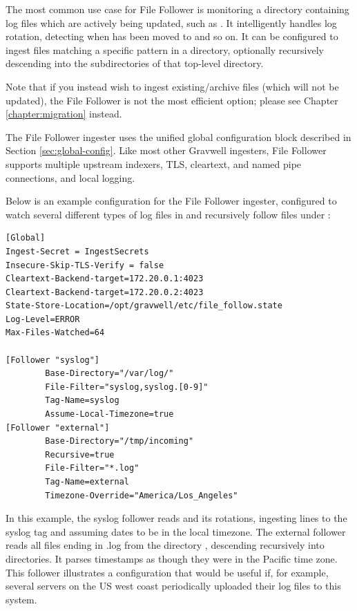 The most common use case for File Follower is monitoring a directory
containing log files which are actively being updated, such
as . It intelligently handles log rotation, detecting when
 has been moved to  and so on. It can be configured to
ingest files matching a specific pattern in a directory, optionally
recursively descending into the subdirectories of that top-level
directory.

Note that if you instead wish to ingest existing/archive files (which will not be updated), the File Follower is not the most efficient option; please see Chapter \ref{chapter:migration} instead.

The File Follower ingester uses the unified global configuration block
described in Section \ref{sec:global-config}. Like most other Gravwell ingesters,
File Follower supports multiple upstream indexers, TLS, cleartext, and
named pipe connections, and local logging.

Below is an example configuration for the File Follower ingester,
configured to watch several different types of log files in
 and recursively follow files under :

\begin{Verbatim}[breaklines=true]
[Global]
Ingest-Secret = IngestSecrets
Insecure-Skip-TLS-Verify = false
Cleartext-Backend-target=172.20.0.1:4023
Cleartext-Backend-target=172.20.0.2:4023
State-Store-Location=/opt/gravwell/etc/file_follow.state
Log-Level=ERROR
Max-Files-Watched=64

[Follower "syslog"]
        Base-Directory="/var/log/"
        File-Filter="syslog,syslog.[0-9]" 
        Tag-Name=syslog
        Assume-Local-Timezone=true
[Follower "external"]
        Base-Directory="/tmp/incoming"
        Recursive=true
        File-Filter="*.log"
        Tag-Name=external
        Timezone-Override="America/Los_Angeles"
\end{Verbatim}

In this example, the syslog follower reads  and
its rotations, ingesting lines to the syslog tag and assuming dates to
be in the local timezone. The external follower reads all files ending
in .log from the directory , descending recursively
into directories. It parses timestamps as though they were in the
Pacific time zone. This follower illustrates a configuration that would
be useful if, for example, several servers on the US west coast
periodically uploaded their log files to this system.

